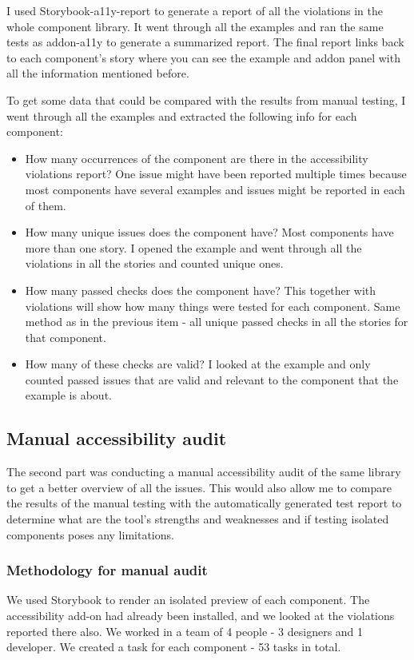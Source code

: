 \documentclass{master_thesis}
\begin{document}
I used Storybook-a11y-report \citep{Karube2020} to generate a report of all the violations in the whole component library. It went through all the examples and ran the same tests as addon-a11y to generate a summarized report. The final report links back to each component's story where you can see the example and addon panel with all the information mentioned before. 

To get some data that could be compared with the results from manual testing, I went through all the examples and extracted the following info for each component:

\begin{itemize}
	\item How many occurrences of the component are there in the accessibility violations report? One issue might have been reported multiple times because most components have several examples and issues might be reported in each of them.
	\item How many unique issues does the component have? Most components have more than one story. I opened the example and went through all the violations in all the stories and counted unique ones.
	\item How many passed checks does the component have? This together with violations will show how many things were tested for each component. Same method as in the previous item - all unique passed checks in all the stories for that component.
	\item How many of these checks are valid? I looked at the example and only counted passed issues that are valid and relevant to the component that the example is about.
\end{itemize}

\subsection{Manual accessibility audit}

The second part was conducting a manual accessibility audit of the same library to get a better overview of all the issues. This would also allow me to compare the results of the manual testing with the automatically generated test report to determine what are the tool's strengths and weaknesses and if testing isolated components poses any limitations.

\subsubsection{Methodology for manual audit}
We used Storybook to render an isolated preview of each component.
The accessibility add-on had already been installed, and we looked at the violations reported there also. We worked in a team of 4 people - 3 designers and 1 developer. We created a task for each component - 53 tasks in total.
\end{document}
